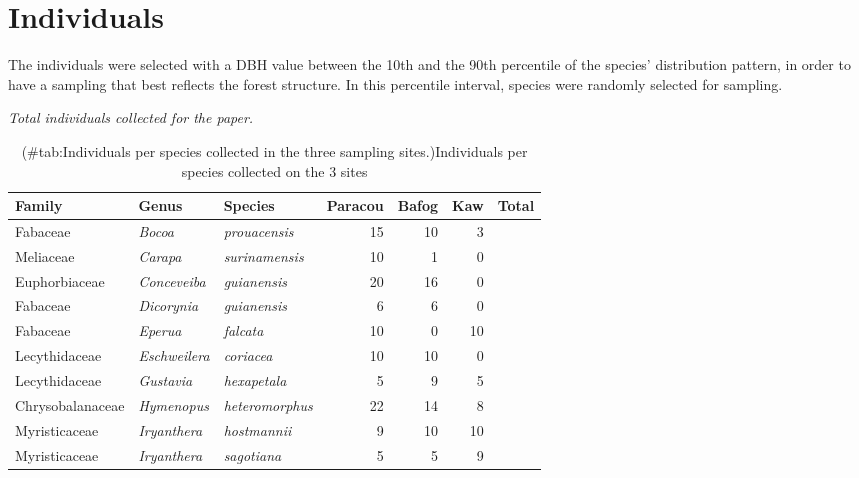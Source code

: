 \documentclass[
]{book}
\begin{document}
\hypertarget{individuals}{%
\section{Individuals}\label{individuals}}

The individuals were selected with a DBH value between the 10th and the 90th percentile of the species' distribution pattern, in order to have a sampling that best reflects the forest structure. In this percentile interval, species were randomly selected for sampling.

\emph{Total individuals collected for the paper.}

\begin{table}

\caption{(\#tab:Individuals per species collected in the three sampling sites.)Individuals per species collected on the 3 sites}
\centering
\begin{tabular}[t]{l|>{}l|>{}l|r|r|r|>{}r}
\hline
\textbf{Family} & \textbf{Genus} & \textbf{Species} & \textbf{Paracou} & \textbf{Bafog} & \textbf{Kaw} & \textbf{Total}\\
\hline
Fabaceae & \em{Bocoa} & \em{prouacensis} & 15 & 10 & 3 & \cellcolor[HTML]{666;}{\textcolor{white}{56}}\\
\hline
Meliaceae & \em{Carapa} & \em{surinamensis} & 10 & 1 & 0 & \cellcolor[HTML]{666;}{\textcolor{white}{22}}\\
\hline
Euphorbiaceae & \em{Conceveiba} & \em{guianensis} & 20 & 16 & 0 & \cellcolor[HTML]{666;}{\textcolor{white}{72}}\\
\hline
Fabaceae & \em{Dicorynia} & \em{guianensis} & 6 & 6 & 0 & \cellcolor[HTML]{666;}{\textcolor{white}{24}}\\
\hline
Fabaceae & \em{Eperua} & \em{falcata} & 10 & 0 & 10 & \cellcolor[HTML]{666;}{\textcolor{white}{40}}\\
\hline
Lecythidaceae & \em{Eschweilera} & \em{coriacea} & 10 & 10 & 0 & \cellcolor[HTML]{666;}{\textcolor{white}{40}}\\
\hline
Lecythidaceae & \em{Gustavia} & \em{hexapetala} & 5 & 9 & 5 & \cellcolor[HTML]{666;}{\textcolor{white}{38}}\\
\hline
Chrysobalanaceae & \em{Hymenopus} & \em{heteromorphus} & 22 & 14 & 8 & \cellcolor[HTML]{666;}{\textcolor{white}{88}}\\
\hline
Myristicaceae & \em{Iryanthera} & \em{hostmannii} & 9 & 10 & 10 & \cellcolor[HTML]{666;}{\textcolor{white}{58}}\\
\hline
Myristicaceae & \em{Iryanthera} & \em{sagotiana} & 5 & 5 & 9 & \cellcolor[HTML]{666;}{\textcolor{white}{38}}\\

\end{tabular}
\end{table}
\end{document}
